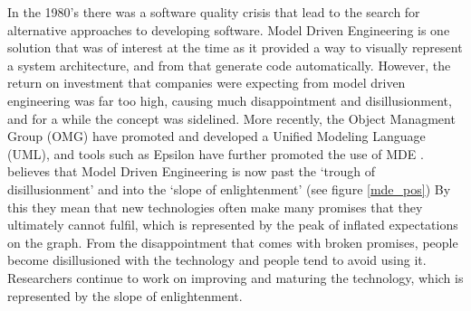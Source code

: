 In the 1980's there was a software quality crisis that lead to the search for alternative approaches to developing software. Model Driven Engineering is one solution that was of interest at the time as it provided a way to visually represent a system architecture, and from that generate code automatically. However, the return on investment that companies were expecting from model driven engineering was far too high, causing much disappointment and disillusionment, and for a while the concept was sidelined. More recently, the Object Managment Group (OMG) have promoted and developed a Unified Modeling Language (UML), and tools such as Epsilon have further promoted the use of MDE \citep{mdeHistory}.  \citet{brambillaBook} believes that Model Driven Engineering is now past the `trough of disillusionment' and into the `slope of enlightenment' (see figure \ref{mde_pos}) By this they mean that new technologies often make many promises that they ultimately cannot fulfil, which is represented by the peak of inflated expectations on the graph. From the disappointment that comes with broken promises, people become disillusioned with the technology and people tend to avoid using it. Researchers continue to work on improving and maturing the technology, which is represented by the slope of enlightenment. \\

